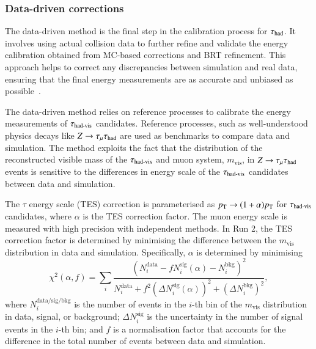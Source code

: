     \subsubsection{Data-driven corrections}
        The data-driven method is the final step in the calibration process for $\tau_{\text{had}}$. 
        It involves using actual collision data to further refine and validate the energy calibration 
        obtained from MC-based corrections and BRT refinement. This approach helps to correct any 
        discrepancies between simulation and real data, ensuring that the final energy measurements 
        are as accurate and unbiased as possible~\cite{ATLAS-CONF-2017-029}.

        The data-driven method relies on reference processes to calibrate the
        energy measurements of $\tau_{\text{had-vis}}$ candidates. Reference processes, such as
        well-understood physics decays like $Z\rightarrow\tau_\mathrm{\mu}\tau_{\text{had}}$ are used as benchmarks to compare data and simulation. 
        The method exploits the fact that the distribution of the reconstructed visible mass of the $\tau_{\text{had-vis}}$ and muon system, $m_\mathrm{vis}$, 
        in $Z\rightarrow\tau_\mathrm{\mu}\tau_{\text{had}}$ events is sensitive to the differences in energy scale of the $\tau_{\text{had-vis}}$ candidates between data and simulation.

        The $\tau$ energy scale (TES) correction is parameterised as $p_{\text{T}}\rightarrow(1+\alpha)p_{\text{T}}$ for $\tau_{\text{had-vis}}$ candidates, where $\alpha$ is the TES correction factor.
        The muon energy scale is measured with high precision with independent methods. In Run 2, the TES correction factor is determined
        by minimising the difference between the $m_\mathrm{vis}$ distribution in data and simulation. Specifically, $\alpha$ is determined by minimising 
        $$\chi^2(\alpha, f) = \sum_i\frac{(N_i^\mathrm{data} - fN_i^\mathrm{sig}(\alpha) - N_i^\mathrm{bkg})^2}{N_i^\mathrm{data} + f^2(\Delta N_i^\mathrm{sig}(\alpha))^2+(\Delta N_i^\mathrm{bkg})^2},$$
        where $N_i^\mathrm{data/sig/bkg}$ is the number of events in the $i$-th bin of the $m_\mathrm{vis}$ distribution in data, signal, or background; 
        $\Delta N_i^\mathrm{sig}$ is the uncertainty in the number of signal events in the $i$-th bin; 
        and $f$ is a normalisation factor that accounts for the difference in the total number of events between data and simulation.
        
